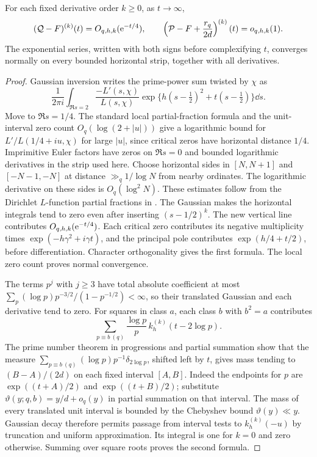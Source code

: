 \begin{proposition}\label{pr:explicit}
For each fixed derivative order \(k\ge0\), as \(t\to\infty\),
\begin{equation}
 (\mathcal Q-F)^{(k)}(t)=O_{q,h,k}(\mathrm e^{-t/4}),\qquad
 \left(\mathcal P-F+\frac{r_q}{2d}\right)^{(k)}(t)=o_{q,h,k}(1).\label{eq:asymp}
\end{equation}
The exponential series, written with both signs before complexifying \(t\), converges normally on every bounded horizontal strip, together with all derivatives.
\end{proposition}
\begin{proof}
Gaussian inversion writes the prime-power sum twisted by \(\chi\) as
\[
 \frac1{2\pi i}\int_{\Re s=2}
 \frac{-L'(s,\chi)}{L(s,\chi)}
 \exp\{h(s-\tfrac12)^2+t(s-\tfrac12)\}\dd s.
\]
Move to \(\Re s=1/4\). The standard local partial-fraction formula and the unit-interval zero count \(O_q(\log(2+|u|))\) give a logarithmic bound for \(L'/L(1/4+iu,\chi)\) for large \(|u|\), since critical zeros have horizontal distance \(1/4\). Imprimitive Euler factors have zeros on \(\Re s=0\) and bounded logarithmic derivatives in the strip used here. Choose horizontal sides in \([N,N+1]\) and \([-N-1,-N]\) at distance \(\gg_q1/\log N\) from nearby ordinates. The logarithmic derivative on these sides is \(O_q(\log^2 N)\). These estimates follow from the Dirichlet \(L\)-function partial fractions in \cite{kouk}. The Gaussian makes the horizontal integrals tend to zero even after inserting \((s-1/2)^k\).
The new vertical line contributes \(O_{q,h,k}(\mathrm e^{-t/4})\). Each critical zero contributes its negative multiplicity times \(\exp(-h\gamma^2+i\gamma t)\), and the principal pole contributes \(\exp(h/4+t/2)\), before differentiation. Character orthogonality gives the first formula. The local zero count proves normal convergence.

The terms \(p^j\) with \(j\ge3\) have total absolute coefficient at most
\(\sum_p(\log p)p^{-3/2}/(1-p^{-1/2})<\infty\), so their translated Gaussian and each derivative tend to zero. For squares in class \(a\), each class \(b\) with \(b^2=a\) contributes
\[
 \sum_{p\equiv b\ (q)}\frac{\log p}{p}\,k_h^{(k)}(t-2\log p).
\]
The prime number theorem in progressions and partial summation show that the measure
\(\sum_{p\equiv b\ (q)}(\log p)p^{-1}\delta_{2\log p}\), shifted left by \(t\), gives mass tending to \((B-A)/(2d)\) on each fixed interval \([A,B]\). Indeed the endpoints for \(p\) are \(\exp((t+A)/2)\) and \(\exp((t+B)/2)\); substitute \(\vartheta(y;q,b)=y/d+o_q(y)\) in partial summation on that interval. The mass of every translated unit interval is bounded by the Chebyshev bound \(\vartheta(y)\ll y\). Gaussian decay therefore permits passage from interval tests to \(k_h^{(k)}(-u)\) by truncation and uniform approximation. Its integral is one for \(k=0\) and zero otherwise. Summing over square roots proves the second formula.
\end{proof}


